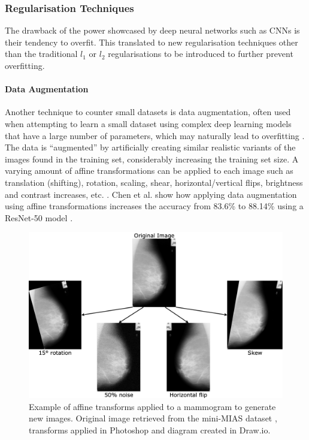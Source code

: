 \subsubsection{Regularisation Techniques}

The drawback of the power showcased by deep neural networks such as CNNs is their tendency to overfit. This translated to new regularisation techniques other than the traditional $l_1$ or $l_2$ regularisations to be introduced to further prevent overfitting.

\paragraph{Data Augmentation}
\label{sec:litsurvey-data-augmentation}

Another technique to counter small datasets is data augmentation, often used when attempting to learn a small dataset using complex deep learning models that have a large number of parameters, which may naturally lead to overfitting \citep{Jadoon2017}. The data is ``augmented'' by artificially creating similar realistic variants of the images found in the training set, considerably increasing the training set size. A varying amount of affine transformations can be applied to each image such as translation (shifting), rotation, scaling, shear, horizontal/vertical flips, brightness and contrast increases, etc. \citep{Geron2019}. Chen et al. show how applying data augmentation using affine transformations increases the accuracy from 83.6\% to 88.14\% using a ResNet-50 model \citep{Chen2019}.

\begin{figure}[ht]
\centerline{\includegraphics[width=\textwidth]{figures/litsurvey/Data augmentation example.png}}
\caption{\label{fig:litsurvey-Data augmentation example}Example of affine transforms applied to a mammogram to generate new images. Original image retrieved from the mini-MIAS dataset \citep{Suckling1994}, transforms applied in Photoshop and diagram created in Draw.io.}
\end{figure}

